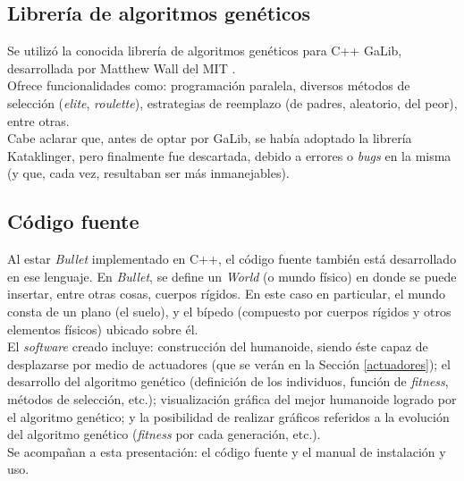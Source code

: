 \documentclass{article}
\begin{document}
\subsection{Librer\'ia de algoritmos gen\'eticos}

Se utiliz\'o la conocida librer\'ia de algoritmos gen\'eticos para C++ GaLib, desarrollada por Matthew Wall del MIT \cite{LinkGaLib}. \\
Ofrece funcionalidades como: programaci\'on paralela, diversos m\'etodos de selecci\'on (\textit{elite}, \textit{roulette}), estrategias de reemplazo (de padres, aleatorio, del peor), entre otras.\\
Cabe aclarar que, antes de optar por GaLib, se hab\'ia adoptado la librer\'ia Kataklinger, pero finalmente fue descartada, debido a errores o \textit{bugs} en la misma (y que, cada vez, resultaban ser m\'as inmanejables).


\subsection{C\'odigo fuente}

Al estar \textit{Bullet} implementado en C++, el c\'odigo fuente tambi\'en est\'a desarrollado en ese lenguaje. En \textit{Bullet}, se define un \textit{World} (o mundo f\'isico) en donde se puede insertar, entre otras cosas, cuerpos r\'igidos. En este caso en particular, el mundo consta de un plano  (el suelo), y  el b\'ipedo (compuesto por cuerpos r\'igidos y otros elementos f\'isicos) ubicado sobre \'el. \\
El \textit{software} creado incluye: construcci\'on del humanoide, siendo \'este capaz de desplazarse por medio de actuadores (que se ver\'an en la Secci\'on \ref{actuadores}); el desarrollo del algoritmo gen\'etico (definici\'on de los individuos, funci\'on de \textit{fitness}, m\'etodos de selecci\'on, etc.); visualizaci\'on gr\'afica del mejor humanoide logrado por el algoritmo gen\'etico; y la posibilidad de realizar gr\'aficos referidos a la evoluci\'on del algoritmo gen\'etico (\textit{fitness} por cada generaci\'on, etc.). \\
Se acompa\~nan a esta presentaci\'on: el c\'odigo fuente y el manual de instalaci\'on y uso.

\end{document}
